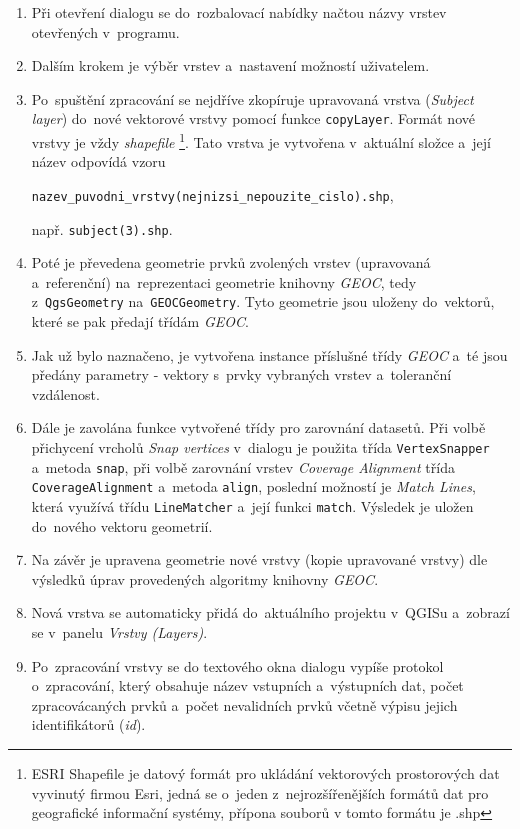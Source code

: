 \begin{enumerate}
 \item Při otevření dialogu se do~rozbalovací nabídky načtou názvy vrstev 
	otevřených v~programu.
 \item Dalším krokem je výběr vrstev a~nastavení možností uživatelem.
 \item Po~spuštění zpracování se nejdříve zkopíruje upravovaná vrstva 
	(\textit{Subject layer}) do~nové vektorové vrstvy pomocí funkce 
	\texttt{copyLayer}. Formát nové vrstvy je vždy \textit{shapefile}
	\footnote{ESRI Shapefile je datový formát pro ukládání vektorových 
	  prostorových dat  vyvinutý firmou Esri, jedná se o~jeden 
	  z~nejrozšířenějších formátů dat pro geografické informační systémy,
	  přípona souborů v tomto formátu je .shp}.
	Tato vrstva je vytvořena v~aktuální složce a~její název odpovídá vzoru 
	\begin{center}
	 \texttt{nazev\_puvodni\_vrstvy(nejnizsi\_nepouzite\_cislo).shp},
	\end{center}
	např. \texttt{subject(3).shp}.
 \item Poté je převedena geometrie prvků zvolených vrstev (upravovaná
	a~referenční) na~reprezentaci geometrie knihovny \textit{GEOC},
	tedy z~\texttt{Qgs\-Geo\-metry} na~\texttt{GEOC\-Geo\-metry}. 
	Tyto geometrie 	jsou uloženy do~vektorů, které se pak předají 
	třídám \textit{GEOC}.
 \item Jak už bylo naznačeno, je vytvořena instance příslušné třídy 
	\textit{GEOC} a~té jsou předány parametry - vektory s~prvky vybraných
	vrstev a~toleranční vzdálenost. 
 \item Dále je zavolána funkce vytvořené třídy pro zarovnání datasetů. Při volbě 
	při\-chycení vrcholů \textit{Snap vertices} v~dialogu je použita třída 
	\texttt{Vertex\-Snapper} a~metoda \texttt{snap}, při volbě zarovnání 
	vrstev \textit{Coverage Alignment} třída \texttt{Cove\-rage\-Align\-ment} 
	a~metoda \texttt{align}, poslední možností je \textit{Match Lines}, která
	využívá třídu \texttt{Line\-Matcher} a~její funkci \texttt{match}. 
	Výsledek je uložen do~nového vektoru geometrií.
 \item Na závěr je upravena geometrie nové vrstvy (kopie upravované vrstvy) dle
	výsledků úprav provedených algoritmy knihovny \textit{GEOC}.
 \item Nová vrstva se automaticky přidá do~aktuálního projektu v~QGISu a~zobrazí
	se v~panelu \textit{Vrstvy (Layers)}.
 \item Po~zpracování vrstvy se do textového okna dialogu vypíše protokol 
	o~zpracování, který obsahuje název vstupních a~výstupních dat, počet
	zpracovácaných prvků a~počet nevalidních prvků včetně výpisu jejich
	identifikátorů (\textit{id}).
\end{enumerate}


